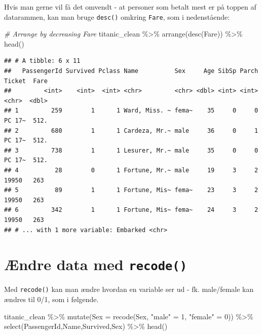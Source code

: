 \documentclass[
]{book}
\newenvironment{Shaded}{\begin{snugshade}}{\end{snugshade}}
\newcommand{\AttributeTok}[1]{\textcolor[rgb]{0.77,0.63,0.00}{#1}}
\newcommand{\CommentTok}[1]{\textcolor[rgb]{0.56,0.35,0.01}{\textit{#1}}}
\newcommand{\DecValTok}[1]{\textcolor[rgb]{0.00,0.00,0.81}{#1}}
\newcommand{\FunctionTok}[1]{\textcolor[rgb]{0.00,0.00,0.00}{#1}}
\newcommand{\NormalTok}[1]{#1}
\newcommand{\OtherTok}[1]{\textcolor[rgb]{0.56,0.35,0.01}{#1}}
\newcommand{\SpecialCharTok}[1]{\textcolor[rgb]{0.00,0.00,0.00}{#1}}
\newcommand{\StringTok}[1]{\textcolor[rgb]{0.31,0.60,0.02}{#1}}
\begin{document}
Hvis man gerne vil få det omvendt - at personer som betalt mest er på toppen af datarammen, kan man bruge \texttt{desc()} omkring \texttt{Fare}, som i nedenstående:

\begin{Shaded}
\begin{Highlighting}[]
\CommentTok{\# Arrange by decreasing Fare}
\NormalTok{titanic\_clean }\SpecialCharTok{\%\textgreater{}\%}
  \FunctionTok{arrange}\NormalTok{(}\FunctionTok{desc}\NormalTok{(Fare)) }\SpecialCharTok{\%\textgreater{}\%}
  \FunctionTok{head}\NormalTok{()}
\end{Highlighting}
\end{Shaded}

\begin{verbatim}
## # A tibble: 6 x 11
##   PassengerId Survived Pclass Name          Sex     Age SibSp Parch Ticket  Fare
##         <int>    <int>  <int> <chr>         <chr> <dbl> <int> <int> <chr>  <dbl>
## 1         259        1      1 Ward, Miss. ~ fema~    35     0     0 PC 17~  512.
## 2         680        1      1 Cardeza, Mr.~ male     36     0     1 PC 17~  512.
## 3         738        1      1 Lesurer, Mr.~ male     35     0     0 PC 17~  512.
## 4          28        0      1 Fortune, Mr.~ male     19     3     2 19950   263 
## 5          89        1      1 Fortune, Mis~ fema~    23     3     2 19950   263 
## 6         342        1      1 Fortune, Mis~ fema~    24     3     2 19950   263 
## # ... with 1 more variable: Embarked <chr>
\end{verbatim}

\hypertarget{uxe6ndre-data-med-recode}{%
\section{\texorpdfstring{Ændre data med \texttt{recode()}}{Ændre data med recode()}}\label{uxe6ndre-data-med-recode}}

Med \texttt{recode()} kan man ændre hvordan en variable ser ud - fk. male/female kan ændres til 0/1, som i følgende.

\begin{Shaded}
\begin{Highlighting}[]
\NormalTok{ titanic\_clean }\SpecialCharTok{\%\textgreater{}\%}
   \FunctionTok{mutate}\NormalTok{(}\AttributeTok{Sex =} \FunctionTok{recode}\NormalTok{(Sex,  }\StringTok{"male"} \OtherTok{=} \DecValTok{1}\NormalTok{, }\StringTok{"female"} \OtherTok{=} \DecValTok{0}\NormalTok{)) }\SpecialCharTok{\%\textgreater{}\%}
   \FunctionTok{select}\NormalTok{(PassengerId,Name,Survived,Sex) }\SpecialCharTok{\%\textgreater{}\%} \FunctionTok{head}\NormalTok{()}
\end{Highlighting}
\end{Shaded}
\end{document}
